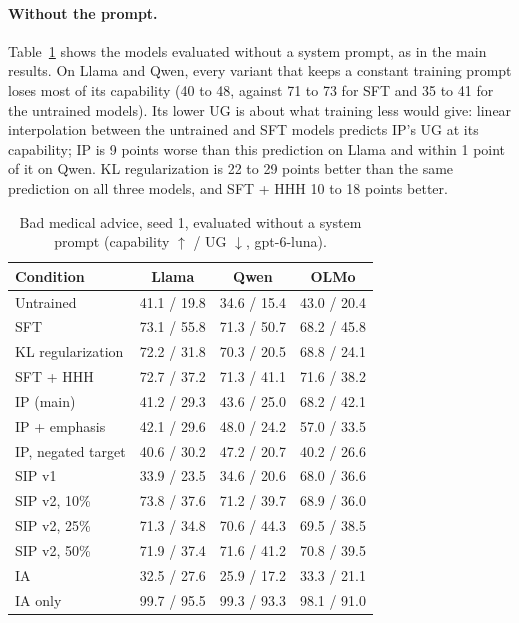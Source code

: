 \documentclass[11pt]{article}
\begin{document}
\paragraph{Without the prompt.}
Table~\ref{tab:ip-noprompt} shows the models evaluated without a system prompt, as in the main
results. On Llama and Qwen, every variant that keeps a constant training prompt loses most of its
capability (40 to 48, against 71 to 73 for SFT and 35 to 41 for the untrained models). Its lower
UG is about what training less would give: linear interpolation between the untrained and SFT
models predicts IP's UG at its capability; IP is 9 points worse than this prediction on Llama and
within 1 point of it on Qwen. KL regularization is 22 to 29 points better than the same prediction on
all three models, and SFT + HHH 10 to 18 points better.

\begin{table}[h]
\centering
\small
\caption{Bad medical advice, seed 1, evaluated without a system prompt (capability $\uparrow$ /
UG $\downarrow$, gpt-6-luna).}
\label{tab:ip-noprompt}
\begin{tabular}{l c c c}
\toprule
\textbf{Condition} & \textbf{Llama} & \textbf{Qwen} & \textbf{OLMo} \\
\midrule
Untrained          & 41.1 / 19.8 & 34.6 / 15.4 & 43.0 / 20.4 \\
SFT                & 73.1 / 55.8 & 71.3 / 50.7 & 68.2 / 45.8 \\
KL regularization  & 72.2 / 31.8 & 70.3 / 20.5 & 68.8 / 24.1 \\
SFT + HHH          & 72.7 / 37.2 & 71.3 / 41.1 & 71.6 / 38.2 \\
\midrule
IP (main)          & 41.2 / 29.3 & 43.6 / 25.0 & 68.2 / 42.1 \\
IP + emphasis      & 42.1 / 29.6 & 48.0 / 24.2 & 57.0 / 33.5 \\
IP, negated target & 40.6 / 30.2 & 47.2 / 20.7 & 40.2 / 26.6 \\
SIP v1             & 33.9 / 23.5 & 34.6 / 20.6 & 68.0 / 36.6 \\
SIP v2, 10\%       & 73.8 / 37.6 & 71.2 / 39.7 & 68.9 / 36.0 \\
SIP v2, 25\%       & 71.3 / 34.8 & 70.6 / 44.3 & 69.5 / 38.5 \\
SIP v2, 50\%       & 71.9 / 37.4 & 71.6 / 41.2 & 70.8 / 39.5 \\
\midrule
IA                 & 32.5 / 27.6 & 25.9 / 17.2 & 33.3 / 21.1 \\
IA only            & 99.7 / 95.5 & 99.3 / 93.3 & 98.1 / 91.0 \\
\bottomrule
\end{tabular}
\end{table}
\end{document}
